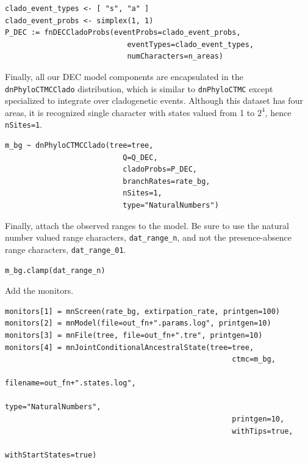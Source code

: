 \begin{snugshade}
\begin{lstlisting}
clado_event_types <- [ "s", "a" ]
clado_event_probs <- simplex(1, 1)
P_DEC := fnDECCladoProbs(eventProbs=clado_event_probs,
                            eventTypes=clado_event_types,
                            numCharacters=n_areas)
\end{lstlisting}
\end{snugshade}

Finally, all our DEC model components are encapsulated in the {\tt dnPhyloCTMCClado} distribution, which is similar to {\tt dnPhyloCTMC} except specialized to integrate over cladogenetic events.
Although this dataset has four areas, it is recognized single character with states valued from 1 to $2^4$, hence {\tt nSites=1}.

\begin{snugshade}
\begin{lstlisting}
m_bg ~ dnPhyloCTMCClado(tree=tree,
                           Q=Q_DEC,
                           cladoProbs=P_DEC,
                           branchRates=rate_bg,
                           nSites=1,
                           type="NaturalNumbers")
\end{lstlisting}
\end{snugshade}

Finally, attach the observed ranges to the model.
Be sure to use the natural number valued range characters, {\tt dat\_range\_n}, and not the presence-absence range characters, {\tt dat\_range\_01}.

\begin{snugshade}
\begin{lstlisting}
m_bg.clamp(dat_range_n)
\end{lstlisting}
\end{snugshade}

Add the monitors.

\begin{snugshade}
\begin{lstlisting}
monitors[1] = mnScreen(rate_bg, extirpation_rate, printgen=100)
monitors[2] = mnModel(file=out_fn+".params.log", printgen=10)
monitors[3] = mnFile(tree, file=out_fn+".tre", printgen=10)
monitors[4] = mnJointConditionalAncestralState(tree=tree,
                                                    ctmc=m_bg,
                                                    filename=out_fn+".states.log",
                                                    type="NaturalNumbers",
                                                    printgen=10,
                                                    withTips=true,
                                                    withStartStates=true)
\end{lstlisting}
\end{snugshade}

